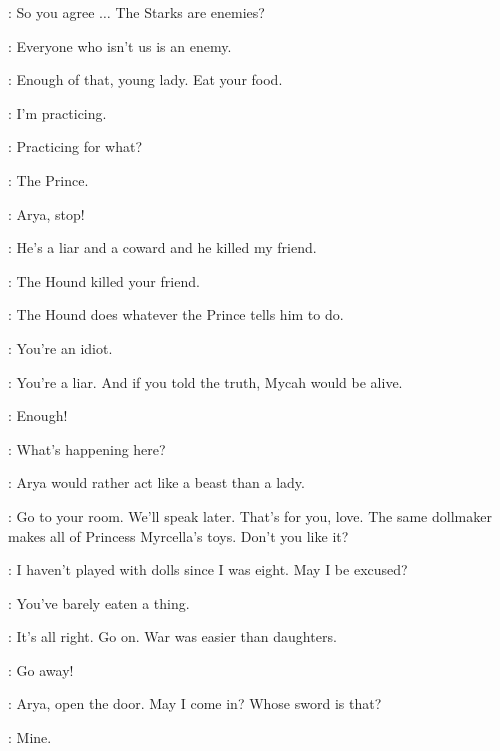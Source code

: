 \JOFFREY: So you agree $\ldots$ The Starks are enemies? 

\CERSEI: Everyone who isn't us is an enemy. 

\scene



\SEPTAMORDANE: Enough of that, young lady. Eat your food. 

\ARYA: I'm practicing. 

\SANSA: Practicing for what? 

\ARYA: The Prince. 

\SEPTAMORDANE: Arya, stop! 

\ARYA: He's a liar and a coward and he killed my friend. 

\SANSA: The Hound killed your friend. 

\ARYA: The Hound does whatever the Prince tells him to do. 

\SANSA: You're an idiot. 

\ARYA: You're a liar. And if you told the truth, Mycah would be alive. 

\SEPTAMORDANE: Enough! 


\NED: What's happening here? 

\SEPTAMORDANE: Arya would rather act like a beast than a lady. 

\NED: Go to your room. We'll speak later.  That's for you, love. The same dollmaker makes all of Princess Myrcella's toys. Don't you like it? 

\SANSA: I haven't played with dolls since I was eight. May I be excused? 

\SEPTAMORDANE: You've barely eaten a thing. 

\NED: It's all right. Go on. War was easier than daughters. 


\scene




\ARYA: Go away! 

\NED: Arya, open the door. May I come in?   Whose sword is that? 

\ARYA: Mine. 

